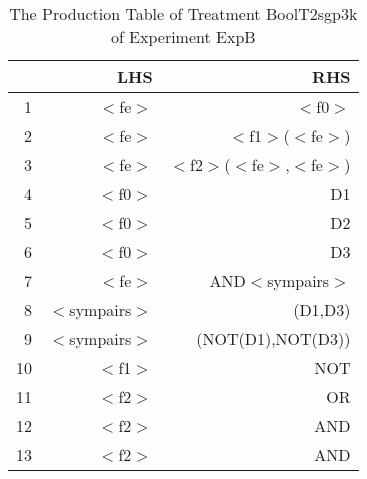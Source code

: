 \begin{table}[ht]
\centering
\begin{tabular}{rrr}
  \hline
 & LHS & RHS \\ 
  \hline
1 & $<$fe$>$ & $<$f0$>$ \\ 
  2 & $<$fe$>$ & $<$f1$>$($<$fe$>$) \\ 
  3 & $<$fe$>$ & $<$f2$>$($<$fe$>$,$<$fe$>$) \\ 
  4 & $<$f0$>$ & D1 \\ 
  5 & $<$f0$>$ & D2 \\ 
  6 & $<$f0$>$ & D3 \\ 
  7 & $<$fe$>$ & AND$<$sympairs$>$ \\ 
  8 & $<$sympairs$>$ & (D1,D3) \\ 
  9 & $<$sympairs$>$ & (NOT(D1),NOT(D3)) \\ 
  10 & $<$f1$>$ & NOT \\ 
  11 & $<$f2$>$ & OR \\ 
  12 & $<$f2$>$ & AND \\ 
  13 & $<$f2$>$ & AND \\ 
   \hline
\end{tabular}
\caption{The Production Table of Treatment BoolT2sgp3k of Experiment ExpB} 
\end{table}
